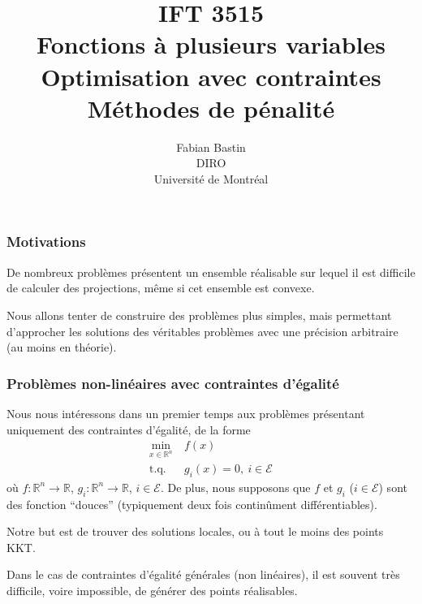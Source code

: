 \documentclass[t,usepdftitle=false,aspectratio=169]{beamer}
\title[IFT3515]{IFT 3515\\Fonctions à plusieurs variables\\Optimisation avec contraintes\\Méthodes de pénalité}
\author[Fabian Bastin]{Fabian Bastin\\DIRO\\Université de Montréal}
\date{}
\def\cE{\mathcal{E}}
\def\RR{\mathbb{R}}
\begin{document}
\frame{\titlepage}


\begin{frame}
\frametitle{Motivations}


\mbox{}

De nombreux problèmes présentent un ensemble réalisable sur lequel il est difficile de calculer des projections, même si cet ensemble est convexe.

\mbox{}

Nous allons tenter de construire des problèmes plus simples, mais permettant d'approcher les solutions des véritables problèmes avec une précision arbitraire (au moins en théorie).

\end{frame}

\begin{frame}
\frametitle{Problèmes non-linéaires avec contraintes d'égalité}

Nous nous intéressons dans un premier temps aux problèmes présentant uniquement des contraintes d'égalité, de la forme
\begin{align*}
\min_{x \in \RR^n}\ & f(x) \\
\mbox{t.q. } &g_i(x) = 0,\ i \in \cE
\end{align*}
où $f: \RR^n \rightarrow \RR$, $g_i: \RR^n \rightarrow \RR$, $i \in \cE$. De plus, nous supposons que $f$ et $g_i$ ($i \in \cE$) sont des fonction ``douces'' (typiquement deux fois continûment différentiables).

\mbox{}

Notre but est de trouver des solutions locales, ou à tout le moins des points KKT.

\mbox{}

Dans le cas de contraintes d'égalité générales (non linéaires), il est souvent très difficile, voire impossible, de générer des points réalisables.

\end{frame}
\end{document}
